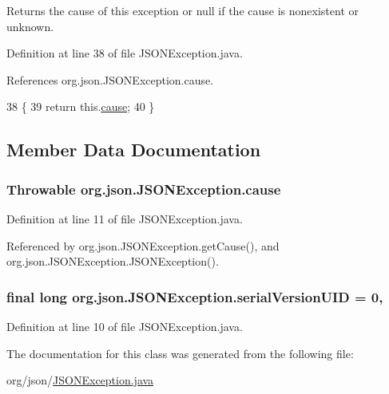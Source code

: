 \begin{DoxyReturn}{Returns}
the cause of this exception or null if the cause is nonexistent or unknown. 
\end{DoxyReturn}


Definition at line 38 of file J\-S\-O\-N\-Exception.\-java.



References org.\-json.\-J\-S\-O\-N\-Exception.\-cause.


\begin{DoxyCode}
38                                 \{
39         \textcolor{keywordflow}{return} this.\hyperlink{classorg_1_1json_1_1_j_s_o_n_exception_adfaad5c0b7a1d41430d2d1e701520e2b}{cause};
40     \}
\end{DoxyCode}


\subsection{Member Data Documentation}
\hypertarget{classorg_1_1json_1_1_j_s_o_n_exception_adfaad5c0b7a1d41430d2d1e701520e2b}{
\subsubsection[{cause}]{\setlength{\rightskip}{0pt plus 5cm}Throwable org.\-json.\-J\-S\-O\-N\-Exception.\-cause\hspace{0.3cm}{\ttfamily [private]}}}\label{classorg_1_1json_1_1_j_s_o_n_exception_adfaad5c0b7a1d41430d2d1e701520e2b}


Definition at line 11 of file J\-S\-O\-N\-Exception.\-java.



Referenced by org.\-json.\-J\-S\-O\-N\-Exception.\-get\-Cause(), and org.\-json.\-J\-S\-O\-N\-Exception.\-J\-S\-O\-N\-Exception().

\hypertarget{classorg_1_1json_1_1_j_s_o_n_exception_afdd64d3f1a75f497c8641f02a49201c9}{
\subsubsection[{serial\-Version\-U\-I\-D}]{\setlength{\rightskip}{0pt plus 5cm}final long org.\-json.\-J\-S\-O\-N\-Exception.\-serial\-Version\-U\-I\-D = 0\hspace{0.3cm}{\ttfamily [static]}, {\ttfamily [private]}}}\label{classorg_1_1json_1_1_j_s_o_n_exception_afdd64d3f1a75f497c8641f02a49201c9}


Definition at line 10 of file J\-S\-O\-N\-Exception.\-java.



The documentation for this class was generated from the following file\-:\begin{DoxyCompactItemize}
\item 
org/json/\hyperlink{_j_s_o_n_exception_8java}{J\-S\-O\-N\-Exception.\-java}\end{DoxyCompactItemize}
